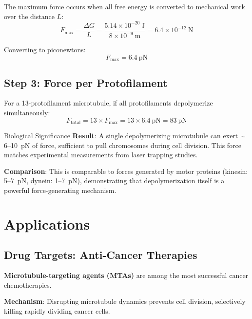 The maximum force occurs when all free energy is converted to mechanical work over the distance $L$:
\begin{equation}
F_{\text{max}} = \frac{\Delta G}{L} = \frac{5.14 \times 10^{-20}~\text{J}}{8 \times 10^{-9}~\text{m}} = 6.4 \times 10^{-12}~\text{N}
\label{eq:force-max}
\end{equation}

Converting to piconewtons:
\begin{equation}
F_{\text{max}} = 6.4~\text{pN}
\label{eq:force-pn}
\end{equation}

\subsection*{Step 3: Force per Protofilament}

For a 13-protofilament microtubule, if all protofilaments depolymerize simultaneously:
\begin{equation}
F_{\text{total}} = 13 \times F_{\text{max}} = 13 \times 6.4~\text{pN} = 83~\text{pN}
\label{eq:total-force}
\end{equation}

\begin{calloutbox}{Biological Significance}
\textbf{Result}: A single depolymerizing microtubule can exert $\sim$6--10~pN of force, sufficient to pull chromosomes during cell division. This force matches experimental measurements from laser trapping studies.

\textbf{Comparison}: This is comparable to forces generated by motor proteins (kinesin: 5--7~pN, dynein: 1--7~pN), demonstrating that depolymerization itself is a powerful force-generating mechanism.
\end{calloutbox}

\section{Applications}
\label{sec:applications}

\subsection{Drug Targets: Anti-Cancer Therapies}
\label{subsec:cancer-drugs}

\textbf{Microtubule-targeting agents (MTAs)} are among the most successful cancer chemotherapies.

\textbf{Mechanism}: Disrupting microtubule dynamics prevents cell division, selectively killing rapidly dividing cancer cells.

